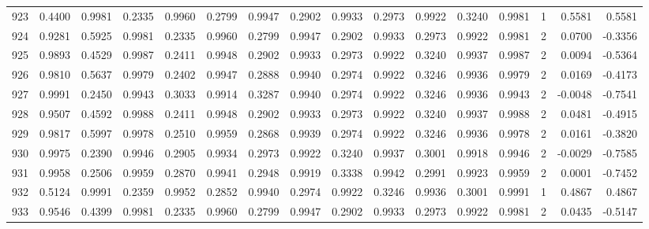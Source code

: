 \begin{tabular}{lrrrrrrrrrrrrrrr}
923 &      0.4400 &  0.9981 &  0.2335 &  0.9960 &  0.2799 &  0.9947 &  0.2902 &  0.9933 &  0.2973 &  0.9922 &   0.3240 &     0.9981 &      1 &                    0.5581 &                     0.5581 \\
924 &      0.9281 &  0.5925 &  0.9981 &  0.2335 &  0.9960 &  0.2799 &  0.9947 &  0.2902 &  0.9933 &  0.2973 &   0.9922 &     0.9981 &      2 &                    0.0700 &                    -0.3356 \\
925 &      0.9893 &  0.4529 &  0.9987 &  0.2411 &  0.9948 &  0.2902 &  0.9933 &  0.2973 &  0.9922 &  0.3240 &   0.9937 &     0.9987 &      2 &                    0.0094 &                    -0.5364 \\
926 &      0.9810 &  0.5637 &  0.9979 &  0.2402 &  0.9947 &  0.2888 &  0.9940 &  0.2974 &  0.9922 &  0.3246 &   0.9936 &     0.9979 &      2 &                    0.0169 &                    -0.4173 \\
927 &      0.9991 &  0.2450 &  0.9943 &  0.3033 &  0.9914 &  0.3287 &  0.9940 &  0.2974 &  0.9922 &  0.3246 &   0.9936 &     0.9943 &      2 &                   -0.0048 &                    -0.7541 \\
928 &      0.9507 &  0.4592 &  0.9988 &  0.2411 &  0.9948 &  0.2902 &  0.9933 &  0.2973 &  0.9922 &  0.3240 &   0.9937 &     0.9988 &      2 &                    0.0481 &                    -0.4915 \\
929 &      0.9817 &  0.5997 &  0.9978 &  0.2510 &  0.9959 &  0.2868 &  0.9939 &  0.2974 &  0.9922 &  0.3246 &   0.9936 &     0.9978 &      2 &                    0.0161 &                    -0.3820 \\
930 &      0.9975 &  0.2390 &  0.9946 &  0.2905 &  0.9934 &  0.2973 &  0.9922 &  0.3240 &  0.9937 &  0.3001 &   0.9918 &     0.9946 &      2 &                   -0.0029 &                    -0.7585 \\
931 &      0.9958 &  0.2506 &  0.9959 &  0.2870 &  0.9941 &  0.2948 &  0.9919 &  0.3338 &  0.9942 &  0.2991 &   0.9923 &     0.9959 &      2 &                    0.0001 &                    -0.7452 \\
932 &      0.5124 &  0.9991 &  0.2359 &  0.9952 &  0.2852 &  0.9940 &  0.2974 &  0.9922 &  0.3246 &  0.9936 &   0.3001 &     0.9991 &      1 &                    0.4867 &                     0.4867 \\
933 &      0.9546 &  0.4399 &  0.9981 &  0.2335 &  0.9960 &  0.2799 &  0.9947 &  0.2902 &  0.9933 &  0.2973 &   0.9922 &     0.9981 &      2 &                    0.0435 &                    -0.5147 \\

\end{tabular}
